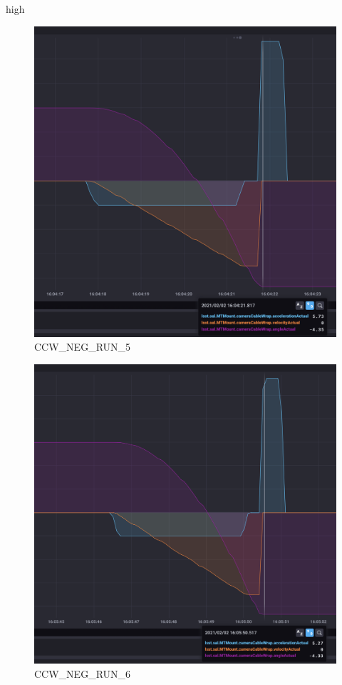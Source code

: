 high\documentclass[SE,lsstdraft,authoryear,toc]{lsstdoc}
\begin{document}
\begin{figure}[h!]
  \includegraphics[width=\linewidth]{media/CCW_design_speed_neg_test5.png}
  \caption{CCW\_NEG\_RUN\_5}
  \label{fig:CCW_NEG_RUN_5}
\end{figure}
\begin{figure}[h!]
  \includegraphics[width=\linewidth]{media/CCW_design_speed_neg_test6.png}
  \caption{CCW\_NEG\_RUN\_6}
  \label{fig:CCW_NEG_RUN_6}
\end{figure}
\end{document}
